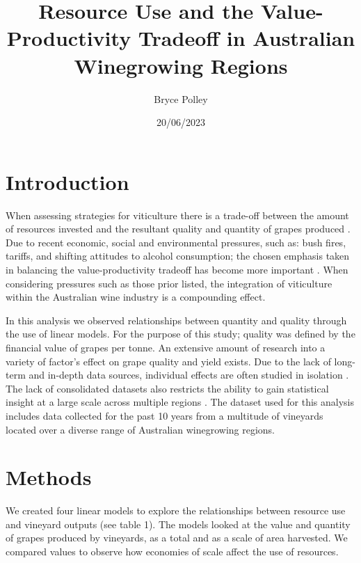 \documentclass[12pt,australian]{article}
\title{Resource Use and the Value-Productivity Tradeoff in Australian Winegrowing Regions}
\author{Bryce Polley}
\date{20/06/2023}
\begin{document}
\begin{sloppypar}

\section{Introduction}
When assessing strategies for viticulture there is a trade-off between the amount of resources invested and the resultant quality and quantity of grapes produced \autocite{montalvo-falconSustainabilityResearchWine2023}. Due to recent economic, social and environmental pressures, such as: bush fires, tariffs, and shifting attitudes to alcohol consumption; the chosen emphasis taken in balancing the value-productivity tradeoff has become more important \autocite{toumbourouStudentSurveyTrends2018,wineaustraliaNationalVintageReport2020,wineaustraliaNationalVintageReport2022}. When considering pressures such as those prior listed, the integration of viticulture within the Australian wine industry is a compounding effect.

In this analysis we observed relationships between quantity and quality through the use of linear models. For the purpose of this study; quality was defined by the financial value of grapes per tonne. An extensive amount of research into a variety of factor's effect on grape quality and yield exists. Due to the lack of long-term and in-depth data sources, individual effects are often studied in isolation \autocite{abbalDecisionSupportSystem2016}. The lack of consolidated datasets also restricts the ability to gain statistical insight at a large scale across multiple regions \autocite{keithjonesAustralianWineIndustry2002,knightFirmResourcesDevelopment2019}. The dataset used for this analysis includes data collected for the past 10 years from a multitude of vineyards located over a diverse range of Australian winegrowing regions.

\section{Methods}
We created four linear models to explore the relationships between resource use and vineyard outputs (see table 1). The models looked at the value and quantity of grapes produced by vineyards, as a total and as a scale of area harvested. We compared values to observe how economies of scale affect the use of resources.


\end{sloppypar}
\end{document}
